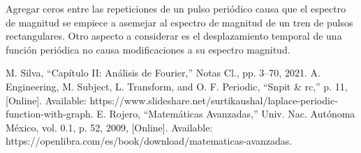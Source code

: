 \documentclass[11pt,a4paper,twocolumn]{article}
\begin{document}
    Agregar ceros entre las repeticiones de un pulso periódico causa que el espectro de magnitud 
    se empiece a asemejar al espectro de magnitud de un tren de pulsos rectangulares. Otro aspecto a 
    considerar es el desplazamiento temporal de una función periódica no causa modificaciones a su espectro 
    magnitud. 

\begin{thebibliography}{99}
        M. Silva, “Capítulo II: Análisis de Fourier,” Notas Cl., pp. 3–70, 2021.
        A. Engineering, M. Subject, L. Transform, and O. F. Periodic, “Snpit \& rc,” p. 11, [Online]. Available: https://www.slideshare.net/surtikaushal/laplace-periodic-function-with-graph.
        E. Rojero, “Matemáticas Avanzadas,” Univ. Nac. Autónoma México, vol. 0.1, p. 52, 2009, [Online]. Available: https://openlibra.com/es/book/download/matematicas-avanzadas.
\end{thebibliography}
\end{document}
